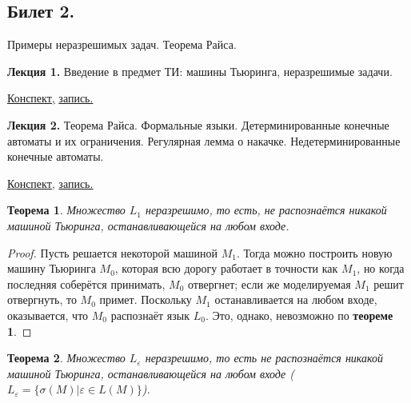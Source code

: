 \documentclass[a4paper]{article}
\newcommand{\mybox}{%
    \collectbox{%
        \setlength{\fboxsep}{1pt}%
        \fbox{\BOXCONTENT}%
    }%
}
\theoremstyle{indented}
\newtheorem{theorem}{Теорема}
\theoremstyle{definition}
\theoremstyle{remark}
\begin{document}
\newpage 

\subsection{Билет 2.}

Примеры неразрешимых задач. Теорема Райса.

\hrulefill

\textbf{Лекция 1.} Введение в предмет ТИ: машины Тьюринга, неразрешимые задачи.

\begin{flushright}
    \mybox{
        \href{https://users.math-cs.spbu.ru/~okhotin/teaching/tcs_fl_2021/okhotin_tcs_fl_2021_l1.pdf}{Конспект,}
        \href{https://disk.yandex.ru/d/knoQ44wLmGDwwQ/2021-2022%20учебный%20год%20(осенний%20семестр)/2%20курс/Теоретическая%20информатика/Теор%20информатика%2C%20лекция%2C%2001.09.2021.mp4}{запись.}
    }
\end{flushright}

\textbf{Лекция 2.} Теорема Райса. Формальные языки. Детерминированные конечные автоматы и их ограничения. Регулярная лемма о накачке. Недетерминированные конечные автоматы.

\begin{flushright}
    \mybox{
        \href{https://users.math-cs.spbu.ru/~okhotin/teaching/tcs_fl_2021/okhotin_tcs_fl_2021_l2.pdf}{Конспект,}
        \href{https://disk.yandex.ru/d/knoQ44wLmGDwwQ/2021-2022%20учебный%20год%20(осенний%20семестр)/2%20курс/Теоретическая%20информатика/Теор%20информатика%2C%202%20курс%2C%20лекция%2C%20%2008.09.2021.mp4}{запись.}
    }
\end{flushright}

\begin{theorem}
    Множество $L_1$ неразрешимо, то есть, не распознаётся никакой машиной Тьюринга, останавливающейся на любом входе.
\end{theorem}

\begin{proof}
    Пусть решается некоторой машиной $M_1$. Тогда можно построить новую машину Тьюринга $M_0$, которая всю дорогу работает в точности как $M_1$, но когда последняя соберётся принимать, $M_0$ отвергнет; если же моделируемая $M_1$ решит отвергнуть, то $M_0$ примет. Поскольку $M_1$ останавливается на любом входе, оказывается, что $M_0$ распознаёт язык $L_0$. Это, однако, невозможно по \textbf{теореме 1}.
\end{proof}

\begin{theorem}
    Множество $L_\varepsilon$ неразрешимо, то есть не распознаётся никакой машиной Тьюринга, останавливающейся на любом входе ($L_\varepsilon = \{\sigma(M) | \varepsilon \in L(M)\}$).
\end{theorem}
\end{document}
